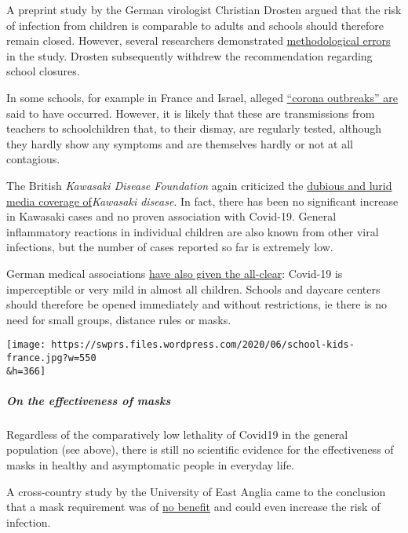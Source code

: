 A preprint study by the German virologist Christian Drosten argued that
the risk of infection from children is comparable to adults and schools
should therefore remain closed. However, several researchers
demonstrated
\href{https://www.nau.ch/news/europa/coronavirus-forscher-drangen-drosten-zum-ruckzug-der-kinder-studie-65714012}{methodological
errors} in the study. Drosten subsequently withdrew the recommendation
regarding school closures.

In some schools, for example in France and Israel, alleged
\href{https://www.npr.org/sections/coronavirus-live-updates/2020/06/03/868507524/israel-orders-schools-to-close-when-covid-19-cases-are-discovered}{``corona
outbreaks'' are} said to have occurred. However, it is likely that these
are transmissions from teachers to schoolchildren that, to their dismay,
are regularly tested, although they hardly show any symptoms and are
themselves hardly or not at all contagious.

The British \emph{Kawasaki Disease Foundation} again criticized the
\href{https://www.societi.org.uk/kawasaki-disease-and-covid-19/}{dubious
and lurid media coverage of}\emph{Kawasaki disease}. In fact, there has
been no significant increase in Kawasaki cases and no proven association
with Covid-19. General inflammatory reactions in individual children are
also known from other viral infections, but the number of cases reported
so far is extremely low.

German medical associations
\href{https://www.welt.de/politik/deutschland/article208075525/Corona-Kitas-und-Grundschulen-vollstaendig-oeffnen-uneingeschraenkt.html}{have
also given the all-clear}: Covid-19 is imperceptible or very mild in
almost all children. Schools and daycare centers should therefore be
opened immediately and without restrictions, ie there is no need for
small groups, distance rules or masks.

\texttt{[image: https://swprs.files.wordpress.com/2020/06/school-kids-france.jpg?w=550\\\&h=366]}

\hypertarget{on-the-effectiveness-of-masks-1}{%
\subparagraph{\texorpdfstring{\textbf{On the effectiveness of
masks}}{On the effectiveness of masks}}\label{on-the-effectiveness-of-masks-1}}

Regardless of the comparatively low lethality of Covid19 in the general
population (see above), there is still no scientific evidence for the
effectiveness of masks in healthy and asymptomatic people in everyday
life.

A cross-country study by the University of East Anglia came to the
conclusion that a mask requirement was of
\href{https://www.uea.ac.uk/about/-/new-study-reveals-blueprint-for-getting-out-of-covid-19-lockdown}{no
benefit} and could even increase the risk of infection.

